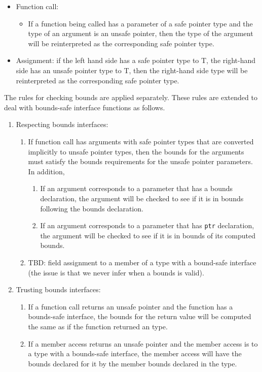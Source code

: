 \begin{itemize}
\item
  Function call:

  \begin{itemize}
  \item
    If a function being called has a parameter of a safe pointer type
    and the type of an argument is an unsafe pointer, then the type of
    the argument will be reinterpreted as the corresponding safe pointer
    type.
  \end{itemize}
\item
  Assignment: if the left hand side has a safe pointer type to T, the
  right-hand side has an unsafe pointer type to T, then the right-hand
  side type will be reinterpreted as the corresponding safe pointer
  type.
\end{itemize}

The rules for checking bounds are applied separately. These rules are
extended to deal with bounds-safe interface functions as follows.

\begin{enumerate}
\item
  Respecting bounds interfaces:

  \begin{enumerate}
  \item
    If function call has arguments with safe pointer types that are
    converted implicitly to unsafe pointer types, then the bounds for
    the arguments must satisfy the bounds requirements for the unsafe
    pointer parameters. In addition,

    \begin{enumerate}
    \item
      If an argument corresponds to a parameter that has a bounds
      declaration, the argument will be checked to see if it is in
      bounds following the bounds declaration.
    \item
      If an argument corresponds to a parameter that has \texttt{ptr}
      declaration, the argument will be checked to see if it is in
      bounds of its computed bounds.
    \end{enumerate}
  \item
    TBD: field assignment to a member of a type with a bound-safe
    interface (the issue is that we never infer when a bounds is valid).
  \end{enumerate}
\item
  Trusting bounds interfaces:

  \begin{enumerate}
  \item
    If a function call returns an unsafe pointer and the function has a
    bounds-safe interface, the bounds for the return value will be
    computed the same as if the function returned an \arrayptr
    type.
  \item
    If a member access returns an unsafe pointer and the member access
    is to a type with a bounds-safe interface, the member access will
    have the bounds declared for it by the member bounds declared in the
    type.
  \end{enumerate}
\end{enumerate}

